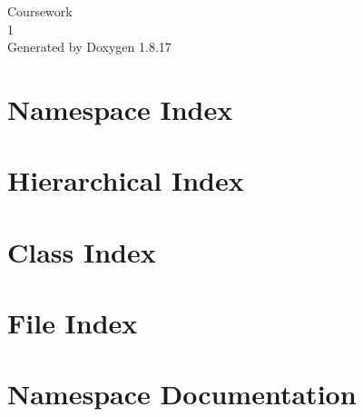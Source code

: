 \let\mypdfximage\pdfximage\def\pdfximage{\immediate\mypdfximage}\documentclass[twoside]{book}
\newcommand{\+}{\discretionary{\mbox{\scriptsize$\hookleftarrow$}}{}{}}
\newcommand{\clearemptydoublepage}{%
  \newpage{\pagestyle{empty}\cleardoublepage}%
}
\begin{document}
\begin{titlepage}
\vspace*{7cm}
\begin{center}%
{\Large Coursework \\[1ex]\large 1 }\\
\vspace*{1cm}
{\large Generated by Doxygen 1.8.17}\\
\end{center}
\end{titlepage}
\clearemptydoublepage
{}
\tableofcontents
\clearemptydoublepage
{}

\chapter{Namespace Index}

\chapter{Hierarchical Index}

\chapter{Class Index}

\chapter{File Index}

\chapter{Namespace Documentation}



\end{document}
